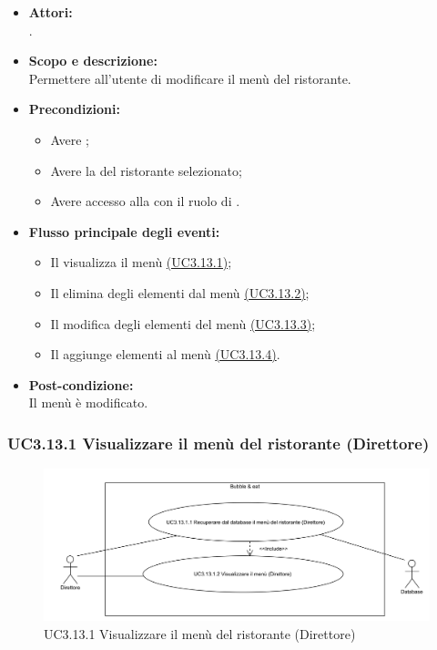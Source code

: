 \begin{itemize}
	\item \textbf{Attori:}
	\\.
	\item \textbf{Scopo e descrizione:} 
	\\Permettere all'utente  di modificare il menù del ristorante.
	\item \textbf{Precondizioni:}
	\begin{itemize}
		\item Avere ;
		\item Avere la  del ristorante selezionato;
		\item Avere accesso alla  con il ruolo di .
	\end{itemize}
	\item \textbf{Flusso principale degli eventi:}
	\begin{itemize}
		\item Il  visualizza il menù \hyperref[UC3.13.1]{(UC3.13.1)};
		\item Il  elimina degli elementi dal menù \hyperref[UC3.13.2]{(UC3.13.2)};
		\item Il  modifica degli elementi del menù \hyperref[UC3.13.3]{(UC3.13.3)};
		\item Il  aggiunge elementi al menù \hyperref[UC3.13.4]{(UC3.13.4)}.
	\end{itemize}
	\item \textbf{Post-condizione:}
	\\Il menù è modificato.
\end{itemize}

\subsubsection{UC3.13.1 Visualizzare il menù del ristorante (Direttore)} \label{UC3.13.1}

\begin{figure}[H]
	\centering
	\includegraphics[width=15cm]{../../documenti/AnalisiDeiRequisiti/Diagrammi_img/uc3_13_1.png}
	\caption{UC3.13.1 Visualizzare il menù del ristorante (Direttore)}
\end{figure}

